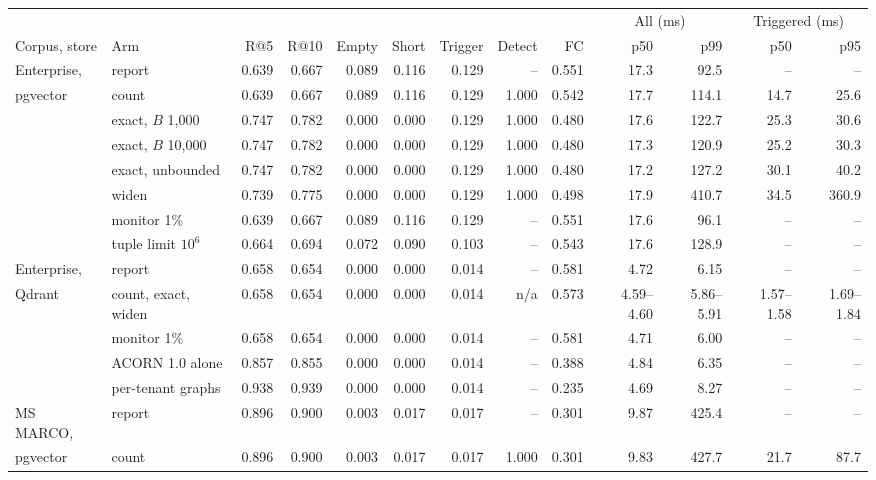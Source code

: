 \begin{table}[tbp]
\centering
\scriptsize\setlength{\tabcolsep}{2pt}
\begin{tabular}{@{}llrrrrrrrrrrr@{}}
\toprule
 & & & & & & & & & \multicolumn{2}{c}{All (ms)} & \multicolumn{2}{c}{Triggered (ms)} \\
\cmidrule(lr){10-11}\cmidrule(lr){12-13}
Corpus, store & Arm & R@5 & R@10 & Empty & Short & Trigger & Detect & FC & p50 & p99 & p50 & p95 \\
\midrule
Enterprise, & report & 0.639 & 0.667 & 0.089 & 0.116 & 0.129 & -- & 0.551 & 17.3 & 92.5 & -- & -- \\
pgvector & count & 0.639 & 0.667 & 0.089 & 0.116 & 0.129 & 1.000 & 0.542 & 17.7 & 114.1 & 14.7 & 25.6 \\
 & exact, $B$ 1,000 & 0.747 & 0.782 & 0.000 & 0.000 & 0.129 & 1.000 & 0.480 & 17.6 & 122.7 & 25.3 & 30.6 \\
 & exact, $B$ 10,000 & 0.747 & 0.782 & 0.000 & 0.000 & 0.129 & 1.000 & 0.480 & 17.3 & 120.9 & 25.2 & 30.3 \\
 & exact, unbounded & 0.747 & 0.782 & 0.000 & 0.000 & 0.129 & 1.000 & 0.480 & 17.2 & 127.2 & 30.1 & 40.2 \\
 & widen & 0.739 & 0.775 & 0.000 & 0.000 & 0.129 & 1.000 & 0.498 & 17.9 & 410.7 & 34.5 & 360.9 \\
 & monitor 1\% & 0.639 & 0.667 & 0.089 & 0.116 & 0.129 & -- & 0.551 & 17.6 & 96.1 & -- & -- \\
 & tuple limit $10^6$ & 0.664 & 0.694 & 0.072 & 0.090 & 0.103 & -- & 0.543 & 17.6 & 128.9 & -- & -- \\
\midrule
Enterprise, & report & 0.658 & 0.654 & 0.000 & 0.000 & 0.014 & -- & 0.581 & 4.72 & 6.15 & -- & -- \\
Qdrant & count, exact, widen & 0.658 & 0.654 & 0.000 & 0.000 & 0.014 & n/a & 0.573 & 4.59--4.60 & 5.86--5.91 & 1.57--1.58 & 1.69--1.84 \\
 & monitor 1\% & 0.658 & 0.654 & 0.000 & 0.000 & 0.014 & -- & 0.581 & 4.71 & 6.00 & -- & -- \\
 & ACORN 1.0 alone & 0.857 & 0.855 & 0.000 & 0.000 & 0.014 & -- & 0.388 & 4.84 & 6.35 & -- & -- \\
 & per-tenant graphs & 0.938 & 0.939 & 0.000 & 0.000 & 0.014 & -- & 0.235 & 4.69 & 8.27 & -- & -- \\
\midrule
MS MARCO, & report & 0.896 & 0.900 & 0.003 & 0.017 & 0.017 & -- & 0.301 & 9.87 & 425.4 & -- & -- \\
pgvector & count & 0.896 & 0.900 & 0.003 & 0.017 & 0.017 & 1.000 & 0.301 & 9.83 & 427.7 & 21.7 & 87.7 \\

\end{tabular}
\end{table}
